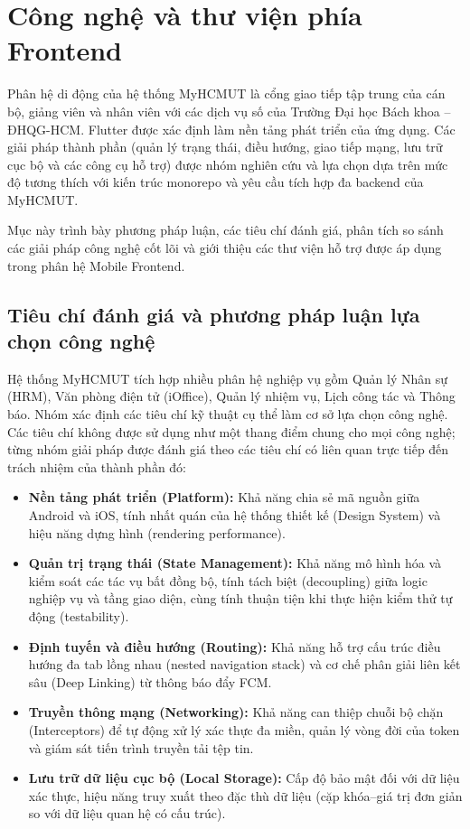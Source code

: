 \section{Công nghệ và thư viện phía Frontend}
\label{sec:frontend_tech}

Phân hệ di động của hệ thống MyHCMUT là cổng giao tiếp tập trung của cán bộ, giảng viên và nhân viên với các dịch vụ số của Trường Đại học Bách khoa -- ĐHQG-HCM. Flutter được xác định làm nền tảng phát triển của ứng dụng. Các giải pháp thành phần (quản lý trạng thái, điều hướng, giao tiếp mạng, lưu trữ cục bộ và các công cụ hỗ trợ) được nhóm nghiên cứu và lựa chọn dựa trên mức độ tương thích với kiến trúc monorepo và yêu cầu tích hợp đa backend của MyHCMUT.

Mục này trình bày phương pháp luận, các tiêu chí đánh giá, phân tích so sánh các giải pháp công nghệ cốt lõi và giới thiệu các thư viện hỗ trợ được áp dụng trong phân hệ Mobile Frontend.

\subsection{Tiêu chí đánh giá và phương pháp luận lựa chọn công nghệ}
\label{subsec:frontend_criteria}

Hệ thống MyHCMUT tích hợp nhiều phân hệ nghiệp vụ gồm Quản lý Nhân sự (HRM), Văn phòng điện tử (iOffice), Quản lý nhiệm vụ, Lịch công tác và Thông báo. Nhóm xác định các tiêu chí kỹ thuật cụ thể làm cơ sở lựa chọn công nghệ. Các tiêu chí không được sử dụng như một thang điểm chung cho mọi công nghệ; từng nhóm giải pháp được đánh giá theo các tiêu chí có liên quan trực tiếp đến trách nhiệm của thành phần đó:

\begin{itemize}
    \item \textbf{Nền tảng phát triển (Platform):} Khả năng chia sẻ mã nguồn giữa Android và iOS, tính nhất quán của hệ thống thiết kế (Design System) và hiệu năng dựng hình (rendering performance).
    \item \textbf{Quản trị trạng thái (State Management):} Khả năng mô hình hóa và kiểm soát các tác vụ bất đồng bộ, tính tách biệt (decoupling) giữa logic nghiệp vụ và tầng giao diện, cùng tính thuận tiện khi thực hiện kiểm thử tự động (testability).
    \item \textbf{Định tuyến và điều hướng (Routing):} Khả năng hỗ trợ cấu trúc điều hướng đa tab lồng nhau (nested navigation stack) và cơ chế phân giải liên kết sâu (Deep Linking) từ thông báo đẩy FCM.
    \item \textbf{Truyền thông mạng (Networking):} Khả năng can thiệp chuỗi bộ chặn (Interceptors) để tự động xử lý xác thực đa miền, quản lý vòng đời của token và giám sát tiến trình truyền tải tệp tin.
    \item \textbf{Lưu trữ dữ liệu cục bộ (Local Storage):} Cấp độ bảo mật đối với dữ liệu xác thực, hiệu năng truy xuất theo đặc thù dữ liệu (cặp khóa--giá trị đơn giản so với dữ liệu quan hệ có cấu trúc).
\end{itemize}


